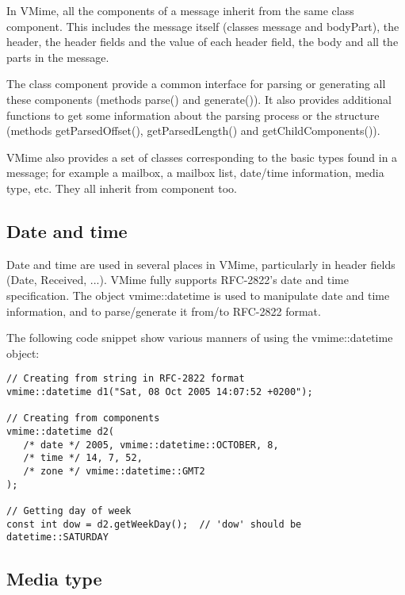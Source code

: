 In VMime, all the components of a message inherit from the same class
{\vcode component}. This includes the message itself (classes {\vcode message}
and {\vcode bodyPart}), the header, the header fields and the value of each
header field, the body and all the parts in the message.

The class component provide a common interface for parsing or generating all
these components (methods {\vcode parse()} and {\vcode generate()}). It also
provides additional functions to get some information about the parsing
process or the structure (methods {\vcode getParsedOffset()},
{\vcode getParsedLength()} and {\vcode getChildComponents()}).

VMime also provides a set of classes corresponding to the basic types found
in a message; for example a mailbox, a mailbox list, date/time information,
media type, etc. They all inherit from {\vcode component} too.

\subsection{Date and time} %

Date and time are used in several places in VMime, particularly in header
fields (Date, Received, ...). VMime fully supports RFC-2822's date and time
specification. The object {\vcode vmime::datetime} is used to manipulate date
and time information, and to parse/generate it from/to RFC-2822 format.

The following code snippet show various manners of using the
{\vcode vmime::datetime} object:

\begin{lstlisting}[caption={Using {\vcode vmime::datetime} object}]
// Creating from string in RFC-2822 format
vmime::datetime d1("Sat, 08 Oct 2005 14:07:52 +0200");

// Creating from components
vmime::datetime d2(
   /* date */ 2005, vmime::datetime::OCTOBER, 8,
   /* time */ 14, 7, 52,
   /* zone */ vmime::datetime::GMT2
);

// Getting day of week
const int dow = d2.getWeekDay();  // 'dow' should be datetime::SATURDAY
\end{lstlisting}

\subsection{Media type} %


